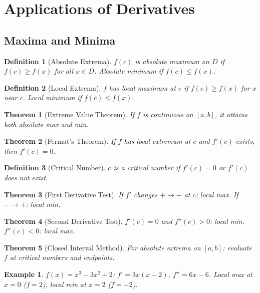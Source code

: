 \documentclass[11pt,a4paper]{article}
\newtheorem{example}{Example}
\newtheorem{theorem}{Theorem}
\newtheorem{definition}{Definition}
\begin{document}
\section{Applications of Derivatives}
\subsection{Maxima and Minima}
\begin{definition}[Absolute Extrema]
$f(c)$ is absolute maximum on $D$ if $f(c) \geq f(x)$ for all $x \in D$. Absolute minimum if $f(c) \leq f(x)$.
\end{definition}
\begin{definition}[Local Extrema]
$f$ has local maximum at $c$ if $f(c) \geq f(x)$ for $x$ near $c$. Local minimum if $f(c) \leq f(x)$.
\end{definition}
\begin{theorem}[Extreme Value Theorem]
If $f$ is continuous on $[a, b]$, it attains both absolute max and min.
\end{theorem}
\begin{theorem}[Fermat's Theorem]
If $f$ has local extremum at $c$ and $f'(c)$ exists, then $f'(c) = 0$.
\end{theorem}
\begin{definition}[Critical Number]
$c$ is a critical number if $f'(c) = 0$ or $f'(c)$ does not exist.
\end{definition}
\begin{theorem}[First Derivative Test]
If $f'$ changes $+ \to -$ at $c$: local max. If $- \to +$: local min.
\end{theorem}
\begin{theorem}[Second Derivative Test]
$f'(c) = 0$ and $f''(c) > 0$: local min. $f''(c) < 0$: local max.
\end{theorem}
\begin{theorem}[Closed Interval Method]
For absolute extrema on $[a,b]$: evaluate $f$ at critical numbers and endpoints.
\end{theorem}
\begin{example}
$f(x) = x^3 - 3x^2 + 2$: $f' = 3x(x-2)$, $f'' = 6x-6$. Local max at $x=0$ ($f=2$), local min at $x=2$ ($f=-2$).
\end{example}
\end{document}
